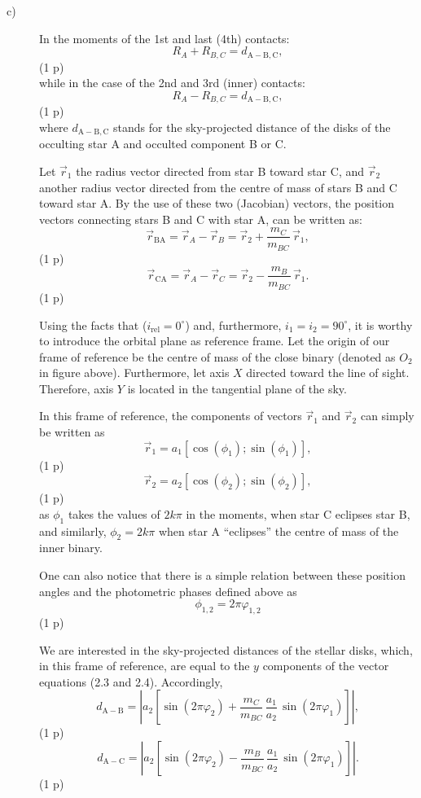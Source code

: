 \begin{description}
\begin{description}
  \item[c)] In the moments of the 1st and last (4th) contacts:
    \[ R_A + R_{B,C} = d_{\mathrm{A-B,C}},
       \tag*{(2.1)} \]
    \hfill(1 p)\\
    while in the case of the 2nd and 3rd (inner) contacts:
    \[ R_A - R_{B,C} = d_{\mathrm{A-B,C}},
       \tag*{(2.2)} \]
    \hfill(1 p)\\
    where $d_{\mathrm{A-B,C}}$ stands for the sky-projected distance of the
    disks of the occulting star A and occulted component B or C.

    Let $\vec{r}_1$ the radius vector directed from star B toward star C,
    and $\vec{r}_2$ another radius vector directed from the centre of mass
    of stars B and C toward star A. By the use of these two (Jacobian)
    vectors, the position vectors connecting stars B and C with star A, can
    be written as:
    \[ \vec{r}_{\mathrm{BA}} = \vec{r}_A - \vec{r}_B
       = \vec{r}_2 + \frac{m_C}{m_{BC}}\,\vec{r}_1,
       \tag*{(2.3)} \]
    \hfill(1 p)
    \[ \vec{r}_{\mathrm{CA}} = \vec{r}_A - \vec{r}_C
       = \vec{r}_2 - \frac{m_B}{m_{BC}}\,\vec{r}_1.
       \tag*{(2.4)} \]
    \hfill(1 p)

    Using the facts that ($i_{\mathrm{rel}} = 0^\circ$) and, furthermore,
    $i_1 = i_2 = 90^\circ$, it is worthy to introduce the orbital plane as
    reference frame. Let the origin of our frame of reference be the centre
    of mass of the close binary (denoted as $O_2$ in figure above).
    Furthermore, let axis $X$ directed toward the line of sight. Therefore,
    axis $Y$ is located in the tangential plane of the sky.

    In this frame of reference, the components of vectors $\vec{r}_1$ and
    $\vec{r}_2$ can simply be written as
    \[ \vec{r}_1 = a_1 \left[ \cos(\phi_1); \sin(\phi_1) \right],
       \tag*{(2.5)} \]
    \hfill(1 p)
    \[ \vec{r}_2 = a_2 \left[ \cos(\phi_2); \sin(\phi_2) \right],
       \tag*{(2.6)} \]
    \hfill(1 p)\\
    as $\phi_1$ takes the values of $2k\pi$ in the moments, when star C
    eclipses star B, and similarly, $\phi_2 = 2k\pi$ when star A
    ``eclipses'' the centre of mass of the inner binary.

    One can also notice that there is a simple relation between these
    position angles and the photometric phases defined above as
    \[ \phi_{1,2} = 2\pi\varphi_{1,2}
       \tag*{(2.7)} \]
    \hfill(1 p)

    We are interested in the sky-projected distances of the stellar disks,
    which, in this frame of reference, are equal to the $y$ components of
    the vector equations (2.3 and 2.4). Accordingly,
    \[ d_{\mathrm{A-B}} = \left| a_2 \left[ \sin(2\pi\varphi_2)
       + \frac{m_C}{m_{BC}}\,\frac{a_1}{a_2}\,\sin(2\pi\varphi_1)
       \right] \right|,
       \tag*{(2.8)} \]
    \hfill(1 p)
    \[ d_{\mathrm{A-C}} = \left| a_2 \left[ \sin(2\pi\varphi_2)
       - \frac{m_B}{m_{BC}}\,\frac{a_1}{a_2}\,\sin(2\pi\varphi_1)
       \right] \right|.
       \tag*{(2.9)} \]
    \hfill(1 p)


\end{description}
\end{description}
